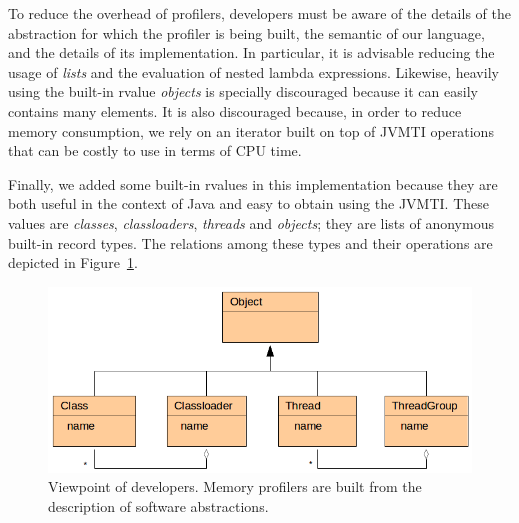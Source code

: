 To reduce the overhead of profilers, developers must be aware of the details of the abstraction for which the profiler is being built, the semantic of our language, and the details of its implementation.
In particular, it is advisable reducing the usage of \textit{lists} and the evaluation of nested lambda expressions.
Likewise, heavily using the built-in rvalue \textit{objects} is specially discouraged because it can easily contains many elements.
It is also discouraged because, in order to reduce memory consumption, we rely on an iterator built on top of JVMTI operations that can be costly to use in terms of CPU time.

Finally, we added some built-in rvalues in this implementation because they are both useful in the context of Java and easy to obtain using the JVMTI.
These values are \textit{classes}, \textit{classloaders}, \textit{threads} and \textit{objects}; they are lists of anonymous built-in record types.
The relations among these types and their operations are depicted in Figure~\ref{fig:dsl-built-in-types}.

\begin{figure}
\centering
\includegraphics[scale=0.45]{./chapter6/fig/diagram-classes.png}
\caption{Viewpoint of developers. Memory profilers are built from the description of software abstractions.}\label{fig:dsl-built-in-types}
\end{figure}


